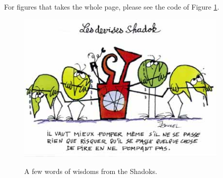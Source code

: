        For figures that takes the whole page, please see the code of Figure \ref{fig:intro:widsom}.
        \begin{figure}[h]
            \centering
            \includegraphics[width=0.9\textwidth]{figure/intro/wisdom}
            \label{fig:intro:widsom}
            \caption{A few words of wisdoms from the Shadoks.}
        \end{figure}